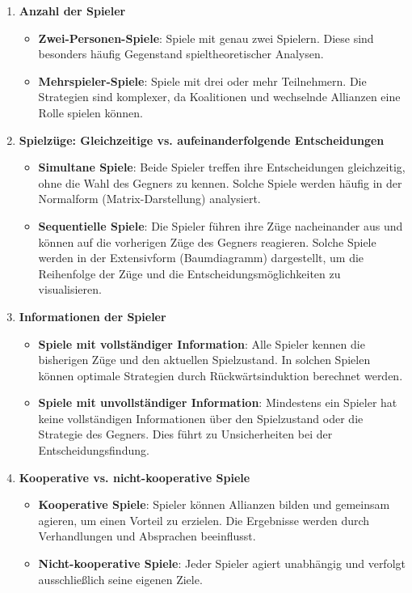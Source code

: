 \begin{enumerate}
	\item \textbf{Anzahl der Spieler}
	\begin{itemize}
		\item \textbf{Zwei-Personen-Spiele}: Spiele mit genau zwei Spielern. Diese sind besonders häufig Gegenstand spieltheoretischer Analysen.
		\item \textbf{Mehrspieler-Spiele}: Spiele mit drei oder mehr Teilnehmern. Die Strategien sind komplexer, da Koalitionen und wechselnde Allianzen eine Rolle spielen können.
	\end{itemize}
	
	\item \textbf{Spielzüge: Gleichzeitige vs. aufeinanderfolgende Entscheidungen}
	\begin{itemize}
		\item \textbf{Simultane Spiele}: Beide Spieler treffen ihre Entscheidungen gleichzeitig, ohne die Wahl des Gegners zu kennen. Solche Spiele werden häufig in der Normalform (Matrix-Darstellung) analysiert.
		\item \textbf{Sequentielle Spiele}: Die Spieler führen ihre Züge nacheinander aus und können auf die vorherigen Züge des Gegners reagieren. Solche Spiele werden in der Extensivform (Baumdiagramm) dargestellt, um die Reihenfolge der Züge und die Entscheidungsmöglichkeiten zu visualisieren.
	\end{itemize}
	
	\item \textbf{Informationen der Spieler}
	\begin{itemize}
		\item \textbf{Spiele mit vollständiger Information}: Alle Spieler kennen die bisherigen Züge und den aktuellen Spielzustand. In solchen Spielen können optimale Strategien durch Rückwärtsinduktion berechnet werden.
		\item \textbf{Spiele mit unvollständiger Information}: Mindestens ein Spieler hat keine vollständigen Informationen über den Spielzustand oder die Strategie des Gegners. Dies führt zu Unsicherheiten bei der Entscheidungsfindung.
	\end{itemize}
	
	\item \textbf{Kooperative vs. nicht-kooperative Spiele}
	\begin{itemize}
		\item \textbf{Kooperative Spiele}: Spieler können Allianzen bilden und gemeinsam agieren, um einen Vorteil zu erzielen. Die Ergebnisse werden durch Verhandlungen und Absprachen beeinflusst.
		\item \textbf{Nicht-kooperative Spiele}: Jeder Spieler agiert unabhängig und verfolgt ausschließlich seine eigenen Ziele.
	\end{itemize}
	

\end{enumerate}
